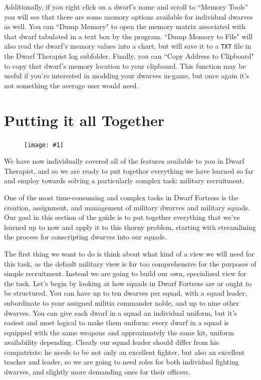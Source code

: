 \documentclass[]{article}
\newcommand{\fullfigure}[1] {
\begin{figure}[h!]
\texttt{[image: \#1]}
\end{figure}
}
\begin{document}
{\begin{flushleft}
Additionally, if you right click on a dwarf's name and scroll to ``Memory Tools'' you will see that there
are some memory options available for individual dwarves as well. You can ``Dump Memory" to open the
memory matrix associated with that dwarf tabulated in a text box by the program. ``Dump Memory to File"
will also read the dwarf's memory values into a chart, but will save it to a \texttt{TXT} file in the
Dwarf Therapist log subfolder. Finally, you can ``Copy Address to Clipboard" to copy that dwarf's memory
location to your clipboard. This function may be useful if you're interested in modding your dwarves
in-game, but once again it's not something the average user would need.
\end{flushleft}
}

\newpage

\section{Putting it all Together}
\label{sec:Putting it all Together}

\fullfigure{Sec5Fig1}

We have now individually covered all of the features available to you in Dwarf Therapist, and so we are
ready to put togethor everything we have learned so far and employ towards solving a particularly
complex task: military recruitment.

One of the most time-consuming and complex tasks in Dwarf Fortress is the creation, assignment, and
management of military dwarves and military squads. Our goal in this section of the guide is to put
together everything that we've learned up to now and apply it to this thorny problem, starting with
streamlining the process for conscripting dwarves into our squads.

The first thing we want to do is think about what kind of a view we will need for this task, as the
default military view is far too comprehensive for the purposes of simple recruitment. Instead we are
going to build our own, specialized view for the task. Let's begin by looking at how squads in Dwarf
Fortress are or ought to be structured. You can have up to ten dwarves per squad, with a squad leader,
subordinate to your assigned militia commander noble, and up to nine other dwarves. You can give each
dwarf in a squad an individual uniform, but it's easiest and most logical to make them uniform: every
dwarf in a squad is equipped with the same weapons and approximately the same kit, uniform availability
depending. Clearly our squad leader should differ from his compatriats: he needs to be not only an
excellent fighter, but also an excellent teacher and leader, so we are going to need roles for both
individual fighting dwarves, and slightly more demanding ones for their officers.
\end{document}

